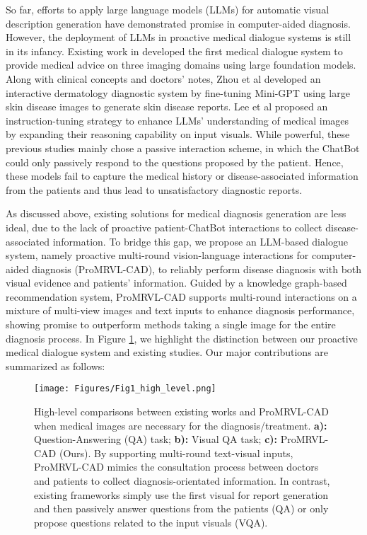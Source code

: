 So far, efforts to apply large language models (LLMs) \cite{openai2023gpt,hoffmann2022training,touvron2023llama,chowdhery2023palm,lee2024llmcxr} for automatic visual description generation have demonstrated promise in computer-aided diagnosis. However, the deployment of LLMs in proactive medical dialogue systems is still in its infancy. Existing work in \cite{wang2023chatcad, zhao2023chatcad+} developed the first medical dialogue system to provide medical advice on three imaging domains using large foundation models. Along with clinical concepts and doctors’ notes, Zhou et al \cite{zhou2023skingpt4} developed an interactive dermatology diagnostic system by fine-tuning Mini-GPT \cite{zhu2023minigpt4} using large skin disease images to generate skin disease reports. Lee et al \cite{lee2024llmcxr} proposed an instruction-tuning strategy to enhance LLMs' understanding of medical images by expanding their reasoning capability on input visuals. While powerful, these previous studies mainly chose a passive interaction scheme, in which the ChatBot could only passively respond to the questions proposed by the patient. Hence, these models fail to capture the medical history or disease-associated information from the patients and thus lead to unsatisfactory diagnostic reports.

As discussed above, existing solutions for medical diagnosis generation are less ideal, due to the lack of proactive patient-ChatBot interactions to collect disease-associated information. To bridge this gap, we propose an LLM-based dialogue system, namely proactive multi-round vision-language interactions for computer-aided diagnosis (ProMRVL-CAD), to reliably perform disease diagnosis with both visual evidence and patients' information. Guided by a knowledge graph-based recommendation system, ProMRVL-CAD supports multi-round interactions on a mixture of multi-view images and text inputs to enhance diagnosis performance, showing promise to outperform methods taking a single image for the entire diagnosis process. In Figure \ref{fig1_high_level}, we highlight the distinction between our proactive medical dialogue system and existing studies. Our major contributions are summarized as follows:

\begin{figure}[t]
\centering
\texttt{[image: Figures/Fig1\_high\_level.png]}
\caption{High-level comparisons between existing works and ProMRVL-CAD when medical images are necessary for the diagnosis/treatment. \textbf{a):} Question-Answering (QA) task; \textbf{b):} Visual QA task; \textbf{c):} ProMRVL-CAD (Ours). By supporting multi-round text-visual inputs, ProMRVL-CAD mimics the consultation process between doctors and patients to collect diagnosis-orientated information. In contrast, existing frameworks simply use the first visual for report generation and then passively answer questions from the patients (QA) or only propose questions related to the input visuals (VQA). }
\label{fig1_high_level}
\end{figure}

